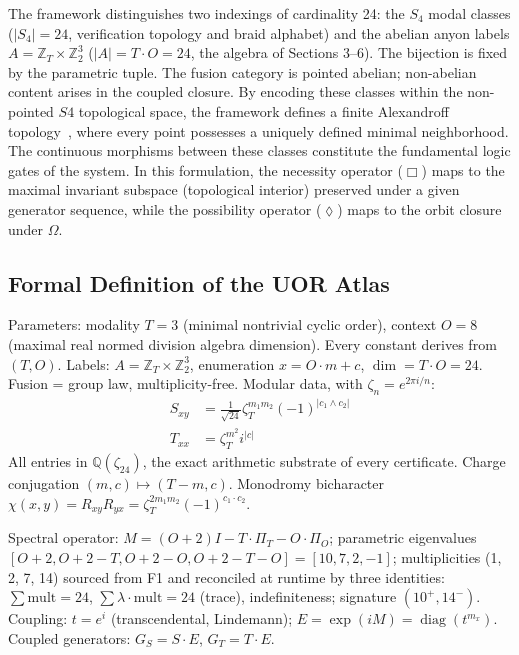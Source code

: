 The framework distinguishes two indexings of cardinality 24: the $S_4$ modal classes ($|S_4| = 24$, verification topology and braid alphabet) and the abelian anyon labels $A = \mathbb{Z}_T \times \mathbb{Z}_2^3$ ($|A| = T \cdot O = 24$, the algebra of Sections 3--6). The bijection is fixed by the parametric tuple. The fusion category is pointed abelian; non-abelian content arises in the coupled closure. By encoding these classes within the non-pointed $S4$ topological space, the framework defines a finite Alexandroff topology~\cite{alexandroff1937}, where every point possesses a uniquely defined minimal neighborhood. The continuous morphisms between these classes constitute the fundamental logic gates of the system. In this formulation, the necessity operator ($\Box$) maps to the maximal invariant subspace (topological interior) preserved under a given generator sequence, while the possibility operator ($\lozenge$) maps to the orbit closure under $\Omega$.

\subsection{Formal Definition of the UOR Atlas}\label{sec:atlas_def}

Parameters: modality $T = 3$ (minimal nontrivial cyclic order), context $O = 8$ (maximal real normed division algebra dimension). Every constant derives from $(T, O)$.
Labels: $A = \mathbb{Z}_T \times \mathbb{Z}_2^3$, enumeration $x = O \cdot m + c$, $\dim = T \cdot O = 24$. Fusion = group law, multiplicity-free.
Modular data, with $\zeta_n = e^{2\pi i/n}$:
\begin{align*}
S_{xy} &= \frac{1}{\sqrt{24}} \zeta_T^{m_1 m_2} {(-1)}^{|c_1 \wedge c_2|} \\
T_{xx} &= \zeta_T^{m^2} i^{|c|}
\end{align*}
All entries in $\mathbb{Q}(\zeta_{24})$, the exact arithmetic substrate of every certificate. Charge conjugation $(m, c) \mapsto (T - m, c)$. Monodromy bicharacter $\chi(x,y) = R_{xy}R_{yx} = \zeta_T^{2m_1m_2} {(-1)}^{c_1 \cdot c_2}$.

Spectral operator: $M = (O+2)I - T \cdot \Pi_T - O \cdot \Pi_O$; parametric eigenvalues $[O+2, O+2-T, O+2-O, O+2-T-O] = [10, 7, 2, -1]$; multiplicities (1, 2, 7, 14) sourced from F1 and reconciled at runtime by three identities: $\sum \text{mult} = 24$, $\sum \lambda \cdot \text{mult} = 24$ (trace), indefiniteness; signature $(10^+, 14^-)$.
Coupling: $t = e^i$ (transcendental, Lindemann); $E = \exp(iM) = \operatorname{diag}(t^{m_x})$. Coupled generators: $G_S = S \cdot E$, $G_T = T \cdot E$.

